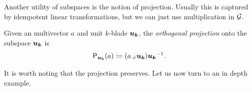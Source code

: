 \documentclass{article}
\begin{document}
Another utility of subspaces is the notion of projection. Usually this is captured by idempotent linear transformations, but we can just use multiplication in $\mathcal{G}$.
\begin{definition}
Given an multivector $a$ and unit $k$-blade $\boldsymbol{u_k}$, the \emph{orthogonal projection} onto the subspace $\boldsymbol{u_k}$ is
\begin{equation}
\label{eq:projection}
\mathsf{P}_{\boldsymbol{u_k}}(a) \coloneqq (a\hspace*{.5mm}\lrcorner \hspace*{.5mm} \boldsymbol{u_k}) \boldsymbol{u_k}^{-1}.
\end{equation}
\end{definition}
It is worth noting that the projection preserves. Let us now turn to an in depth example.
\end{document}
